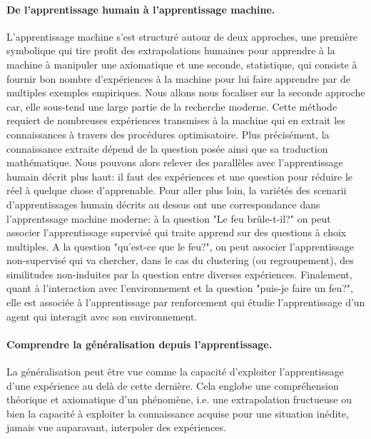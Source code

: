 \paragraph{De l'apprentissage humain à l'apprentissage machine.}
    L'apprentissage machine s'est structuré autour de deux approches, une première symbolique qui tire profit des extrapolations humaines pour apprendre à la machine à manipuler une axiomatique et une seconde, statistique, qui consiste à fournir bon nombre d'expériences à la machine pour lui faire apprendre par de multiples exemples empiriques. Nous allons nous focaliser sur la seconde approche car, elle sous-tend une large partie de la recherche moderne.
    Cette méthode requiert de nombreuses expériences transmises à la machine qui en extrait les connaissances à travers des procédures optimisatoire. Plus précisément, la connaissance extraite dépend de la question posée ainsi que sa traduction mathématique. Nous pouvons alors relever des parallèles avec l'apprentissage humain décrit plus haut: il faut des expériences et une question pour réduire le réel à quelque chose d'apprenable. Pour aller plus loin, la variétés des scenarii d'apprentissages humain décrits au dessus ont une correspondance dans l'apprentssage machine moderne: à la question "Le feu brûle-t-il?" on peut associer l'apprentissage supervisé qui traite apprend sur des questions à choix multiples. A la question "qu'est-ce que le feu?", on peut associer l'apprentissage non-supervisé qui va chercher, dans le cas du clustering (ou regroupement), des similitudes non-induites par la question entre diverses expériences. Finalement, quant à l'interaction avec l'environnement et la question "puis-je faire un feu?", elle est associée à l'apprentissage par renforcement qui étudie l'apprentissage d'un agent qui interagit avec son environnement. 
    
\paragraph{Comprendre la généralisation depuis l'apprentissage.}
 La généralisation peut être vue comme la capacité d'exploiter l'apprentissage d'une expérience au delà de cette dernière. Cela englobe une compréhension théorique et axiomatique d'un phénomène, i.e. une extrapolation fructueuse ou bien la capacité à exploiter la connaissance acquise pour une situation inédite, jamais vue auparavant, \ie interpoler des expériences. 
    
